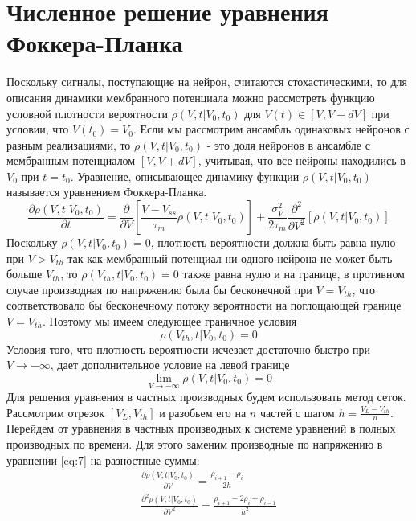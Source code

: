 \section{Численное решение уравнения Фоккера-Планка}
Поскольку сигналы, поступающие на нейрон, считаются стохастическими, то для описания динамики мембранного потенциала можно рассмотреть функцию условной плотности вероятности $\rho(V, t|V_0, t_0)$ для $V(t)\in[V, V+dV]$ при условии, что $V(t_0)=V_0$. Если мы рассмотрим ансамбль одинаковых нейронов с разным реализациями, то $\rho(V, t|V_0, t_0)$ - это доля нейронов в ансамбле с мембранным потенциалом $[V, V+dV]$, учитывая, что все нейроны находились в $V_0$ при $t=t_0$. Уравнение, описывающее динамику функции $\rho(V, t|V_0, t_0)$ называется уравнением Фоккера-Планка.
\begin{equation}
\frac{\partial \rho(V, t|V_0, t_0)}{\partial t}=
\frac{\partial }{\partial V}\left[\frac{V-V_{ss}}{\tau_m}\rho(V, t|V_0, t_0)\right]+\frac{\sigma_V^2}{2\tau_m}\frac{\partial^2 }{\partial V^2}\left[\rho(V, t|V_0, t_0)\right]
\label{eq:8}
\end{equation}
Поскольку $\rho(V, t|V_0, t_0)=0$, плотность вероятности должна быть равна нулю при $V>V_{th}$ так как мембранный потенциал ни одного нейрона не может быть больше $V_{th}$, то $\rho(V_{th}, t|V_0, t_0)=0$ также равна нулю и на границе, в противном случае производная по напряжению была бы бесконечной при $V=V_{th}$, что соответствовало бы бесконечному потоку вероятности на поглощающей границе $V=V_{th}$. Поэтому мы имеем следующее граничное условия 
\begin{equation}
	\rho(V_{th}, t|V_0, t_0)=0
	\label{eq:9}
\end{equation}
Условия того, что плотность вероятности исчезает
достаточно быстро при $V\to-\infty$, дает дополнительное условие на левой границе
\begin{equation}
	\lim\limits_{V\to -\infty}\rho(V, t|V_0, t_0)=0
	\label{eq:10}
\end{equation}
Для решения уравнения в частных производных будем использовать метод сеток. Рассмотрим отрезок $[V_L, V_{th}]$ и разобьем его на $n$ частей с шагом $\displaystyle h=\frac{V_L- V_{th}}{n}$. Перейдем от уравнения в частных производных к системе уравнений в полных производных по времени. Для этого заменим производные по напряжению в уравнении \eqref{eq:7} на разностные суммы:
\begin{equation}
\begin{split}
	\frac{\partial \rho(V, t|V_0, t_0)}{\partial V}=\frac{\rho_{i+1}-\rho_{i}}{2h} \\
	\frac{\partial^2 \rho(V, t|V_0, t_0)}{\partial V^2}=\frac{\rho_{i+1}-2\rho_{i}+\rho_{i-1}}{h^2}
	\label{eq:11}
\end{split}
\end{equation}
